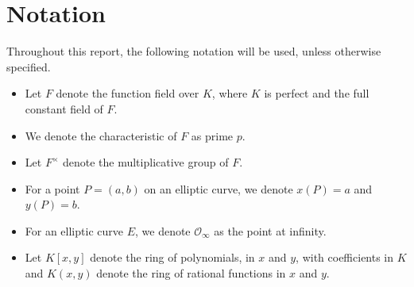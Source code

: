 \documentclass{article}
\theoremstyle{definition}
\newcommand{\6}{\mathbf}
\newcommand{\7}{\mathcal}
\newcommand{\free}[1]{{\textcolor{red}{#1}}}
\newcommand{\divi}[1]{{\text{div}(#1)}}
\newcommand{\lr}[1]{{\langle #1 \rangle}}
\begin{document}
\section{Notation}
Throughout this report, the following notation will be used, unless otherwise specified.
\begin{itemize}
    \item Let $F$ denote the function field over $K$, where $K$ is perfect and the full constant field of $F$.
    \item We denote the characteristic of $F$ as prime $p$.
    \item Let $F^{\times}$ denote the multiplicative group of $F$.
    \item For a point $P = (a,b)$ on an elliptic curve, we denote $x(P) = a$ and $y(P) = b$.
    \item For an elliptic curve $E$, we denote $\mathcal{O}_{\infty}$ as the point at infinity.
    \item Let $K[x,y]$ denote the ring of polynomials, in $x$ and $y$, with coefficients in $K$ and $K(x,y)$ denote the ring of rational functions in $x$ and $y$.
\end{itemize}





\end{document}
